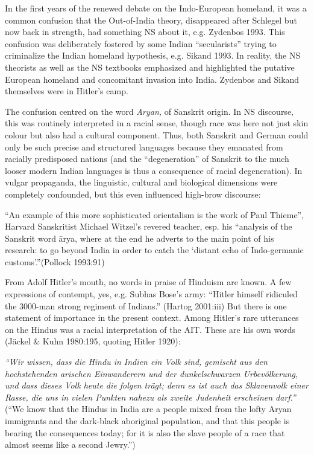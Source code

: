 In the first years of the renewed debate on the Indo-European homeland, it was a common confusion that the Out-of-India theory, disappeared after Schlegel but now back in strength, had something NS about it, e.g. Zydenbos 1993. This confusion was deliberately fostered by some Indian “secularists” trying to criminalize the Indian homeland hypothesis, e.g. Sikand 1993. In reality, the NS theorists as well as the NS textbooks emphasized and highlighted the putative European homeland and concomitant invasion into India. Zydenbos and Sikand themselves were in Hitler’s camp.

The confusion centred on the word {\sl Aryan,} of Sanskrit origin. In NS discourse, this was routinely interpreted in a racial sense, though race was here not just skin colour but also had a cultural component. Thus, both Sanskrit and German could only be such precise and structured languages because they emanated from racially predisposed nations (and the “degeneration” of Sanskrit to the much looser modern Indian languages is thus a consequence of racial degeneration). In vulgar propaganda, the linguistic, cultural and biological dimensions were completely confounded, but this even influenced high-brow discourse: 
\begin{myquote}
“An example of this more sophisticated orientalism is the work of Paul Thieme”, Harvard Sanskritist Michael Witzel’s revered teacher, esp. his “analysis of the Sanskrit word ārya, where at the end he adverts to the main point of his research: to go beyond India in order to catch the ‘distant echo of Indo-germanic customs’.”\hfill (Pollock 1993:91)
\end{myquote}

From Adolf Hitler’s mouth, no words in praise of Hinduism are known. A few expressions of contempt, yes, e.g. Subhas Bose’s army: “Hitler himself ridiculed the 3000-man strong regiment of Indians.” (Hartog 2001:iii) But there is one statement of importance in the present context. Among Hitler’s rare utterances on the Hindus was a racial interpretation of the AIT. These are his own words (Jäckel \& Kuhn 1980:195, quoting Hitler 1920): 
\begin{myquote}
{\sl “Wir wissen, dass die Hindu in Indien ein Volk sind, gemischt aus den hochstehenden arischen Einwanderern und der dunkelschwarzen Urbevölkerung, und dass dieses Volk heute die folgen trägt; denn es ist auch das Sklavenvolk einer Rasse, die uns in vielen Punkten nahezu als zweite Judenheit erscheinen darf.”}
(“We know that the Hindus in India are a people mixed from the lofty Aryan immigrants and the dark-black aboriginal population, and that this people is bearing the consequences today; for it is also the slave people of a race that almost seems like a second Jewry.”)
\end{myquote}

